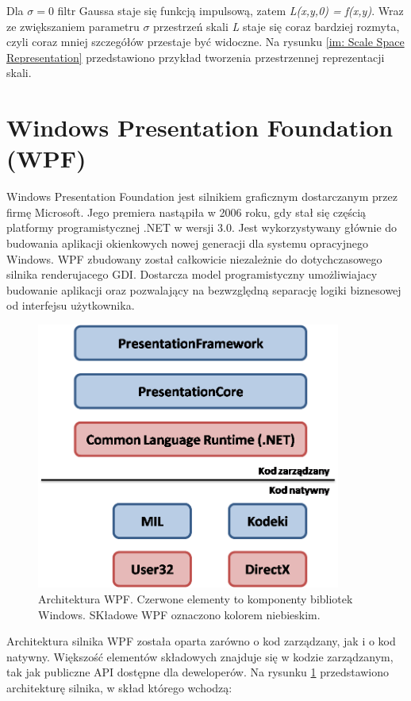 Dla $\sigma = 0$ filtr Gaussa staje się funkcją impulsową, zatem \textit{L(x,y,0) = f(x,y)}. Wraz ze zwiększaniem parametru $\sigma$ przestrzeń skali \textit{L} staje się coraz bardziej rozmyta, czyli coraz mniej szczegółów przestaje być widoczne. Na rysunku \ref{im: Scale Space Representation} przedstawiono przykład tworzenia przestrzennej reprezentacji skali.

\section{Windows Presentation Foundation (WPF)}
Windows Presentation Foundation jest silnikiem graficznym dostarczanym przez firmę Microsoft. Jego premiera nastąpiła w 2006 roku, gdy stał się częścią platformy programistycznej .NET w wersji 3.0.  Jest wykorzystywany głównie do budowania aplikacji okienkowych nowej generacji dla systemu opracyjnego Windows. WPF zbudowany został całkowicie niezależnie do dotychczasowego silnika renderujacego GDI. Dostarcza model programistyczny umożliwiajacy budowanie aplikacji oraz pozwalający na bezwzględną separację logiki biznesowej od interfejsu użytkownika. 

\begin{figure}[h]
	\includegraphics[width=10cm]{WpfArchitecture}
	\centering
	\caption{Architektura WPF. Czerwone elementy to komponenty bibliotek Windows. SKładowe WPF oznaczono kolorem niebieskim.}
	\label{im: WpfArchitecture}
\end{figure} 

Architektura silnika WPF została oparta zarówno o kod zarządzany, jak i o kod natywny.  Większość elementów składowych znajduje się w kodzie zarządzanym, tak jak publiczne API dostępne dla deweloperów. Na rysunku \ref{im: WpfArchitecture} przedstawiono architekturę silnika, w skład którego wchodzą:

